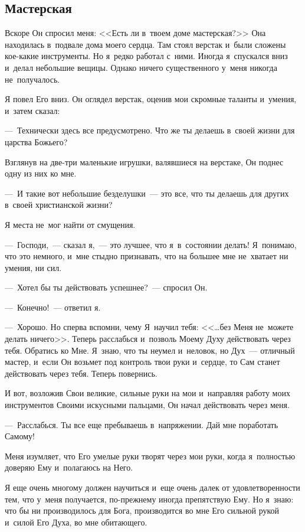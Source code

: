 \documentclass[12pt,article,a4paper,fittopage]{ncc}
\begin{document}
\begin{multicols}{2}
\pagestyle{lheadings}
\section*{Мастерская}

Вскоре Он спросил меня: <<Есть ли в~твоем доме мастерская?>> Она находилась в~подвале дома моего сердца. Там стоял верстак и~были сложены кое-какие инструменты. Но я~редко работал с~ними. Иногда я~спускался вниз и~делал небольшие вещицы. Однако ничего существенного у~меня никогда не~получалось.

Я повел Его вниз. Он оглядел верстак, оценив мои скромные таланты и~умения, и~затем сказал: 

---~Технически здесь все предусмотрено. Что же ты делаешь в~своей жизни для царства Божьего? 

Взглянув на две-три маленькие игрушки, валявшиеся на верстаке, Он поднес одну из них ко мне. 

---~И такие вот небольшие безделушки~--- это все, что ты делаешь для других в~своей христианской жизни?

Я места не~мог найти от смущения. 

---~Господи,~--- сказал я,~--- это лучшее, что я~в~состоянии делать! Я~понимаю, что это немного, и~мне стыдно признавать, что на большее мне не~хватает ни умения, ни сил.

---~Хотел бы ты действовать успешнее?~--- спросил Он.

---~Конечно!~--- ответил я.

---~Хорошо. Но сперва вспомни, чему Я~научил тебя: <<\ldots{}без Меня не~можете делать ничего>>. Теперь расслабься и~позволь Моему Духу действовать через тебя. Обратись ко Мне. Я~знаю, что ты неумел и~неловок, но Дух~--- отличный мастер, и~если Он возьмет под контроль твои руки и~сердце, то Сам станет действовать через тебя. Теперь повернись. 

И вот, возложив Свои великие, сильные руки на мои и~направляя работу моих инструментов Своими искусными пальцами, Он начал действовать через меня. 

---~Расслабься. Ты все еще пребываешь в~напряжении. Дай мне поработать Самому!

Меня изумляет, что Его умелые руки творят через мои руки, когда я~полностью доверяю Ему и~полагаюсь на Него.

Я еще очень многому должен научиться и~еще очень далек от удовлетворенности тем, что у~меня получается, по-прежнему иногда препятствую Ему. Но я~знаю: что бы ни производилось для Бога, производится во мне Его сильной рукой и~силой Его Духа, во мне обитающего.


\end{multicols}
\end{document}
